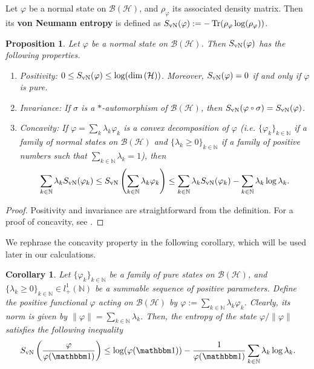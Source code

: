 \documentclass[a4paper,12pt]{article}
\theoremstyle{plain}
\newtheorem{prop}[theo]{Proposition}
\newtheorem{coro}[theo]{Corollary}
\theoremstyle{definition}
\theoremstyle{remark}
\newcommand{\compcent}[1]{\vcenter{\hbox{$#1\circ$}}}
\newcommand{\comp}{\mathbin{\mathchoice
{\compcent\scriptstyle}{\compcent\scriptstyle}
{\compcent\scriptscriptstyle}{\compcent\scriptscriptstyle}}}
\newcommand{\Svn}{S_{\rm vN}}
\def\B{{\mathcal B}}
\def\H{{\mathcal H}}
\def\f{\varphi}
\def\l{\lambda}
\def\s{\sigma}
\def\dim{\mathrm{dim}\,}
\def\1{{\mathbbm 1}}
\DeclareMathOperator{\Tr}{Tr}
\begin{document}
Let $\f$ be a normal state on $\B(\H)$, and $\rho_\f$ its associated
density matrix.  Then its {\bf von Neumann entropy} is defined as
$\Svn(\f) := -\Tr(\rho_\f\log(\rho_\f))$.

\begin{prop}\label{pro:Svn}
  Let $\f$ be a normal state on $\B(\H)$.
  Then $\Svn(\f)$ has the following properties.
  \begin{enumerate}
  \item Positivity: $0 \le \Svn(\f) \le \log(\dim(\H))$. Moreover, $\Svn(\f) = 0$ if and only if $\f$ is pure.
  \item Invariance: If $\s$ is a $*$-automorphism of $\B(\H)$, then $\Svn(\f\comp \s) = \Svn(\f)$.
  \item Concavity: If $\f = \sum_k \l_k \f_k$ is a convex decomposition of $\f$ (\textit{i.e.}\! $\{\f_k\}_{k\in\mathbb{N}}$ if a family of normal states on $\B(\H)$ and $\{ \lambda_k \ge 0 \}_{k\in\mathbb{N}}$ if a family of positive numbers such that $\sum_{k\in\mathbb{N}}\lambda_k = 1$), then
    \[ \sum_{k\in\mathbb{N}} \lambda_k \Svn(\f_k)
    \le \Svn\left(\sum_{k\in\mathbb{N}} \lambda_k \f_k\right) \le
    \sum_{k\in\mathbb{N}} \lambda_k \Svn(\f_k) - \sum_{k\in\mathbb{N}} \lambda_k\log \l_k .\]
  \end{enumerate}
\end{prop}
\begin{proof}Positivity and invariance are straightforward from the definition. For a proof of concavity, see \cite[Proposition 1.6 and 6.2]{ohyapetz}. %
\end{proof}

We rephrase the concavity property in the following corollary, which will be used later in our calculations.
\begin{coro}\label{pro:Svnsum} Let $\{\f_k\}_{k\in\mathbb{N}}$ be a family of pure states on $\B(\H)$, and $\{ \lambda_k \ge 0 \}_{k\in\mathbb{N}} \in l^1_+(\mathbb{N})$ be a summable sequence of positive parameters. Define the positive functional $\f$ acting on $\B(\H)$ by $\f := \sum_{k\in\mathbb{N}} \lambda_k \f_k$. Clearly, its norm is given by $\|\f\| = \sum_{k\in\mathbb{N}}\lambda_k$. Then, the entropy of the state $\f/\|\f\|$ satisfies the following inequality
  \[ \Svn\left(\frac{\f}{\f(\1)}\right) \le \log(\f(\1)) - \frac{1}{\f(\1)}\sum_{k\in\mathbb{N}}\lambda_k\log\lambda_k. \]
\end{coro}
\end{document}
